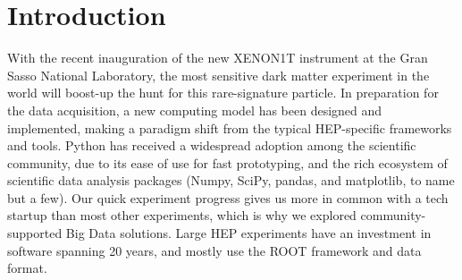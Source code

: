 \documentclass[a4paper]{jpconf}
\begin{document}
\begin{abstract}
\end{abstract}

\section{Introduction}

With the recent inauguration of the new XENON1T instrument at the Gran Sasso National Laboratory,
the most sensitive dark matter experiment in the world will boost-up the hunt for this rare-signature particle.
In preparation for the data acquisition, a new computing model has been designed and implemented, making a paradigm
shift from the typical HEP-specific frameworks and tools. 
Python has received a widespread adoption among the scientific community, due to its ease of use for fast prototyping, and
the rich ecosystem of scientific data analysis packages (Numpy, SciPy, pandas, and matplotlib, to name but a few).
Our quick experiment progress gives us more in common 
with a tech startup than most other experiments, which is why we explored community-supported Big Data solutions.
Large HEP experiments have an investment in software spanning 20 years, and mostly use the ROOT framework and data format. 
\end{document}
